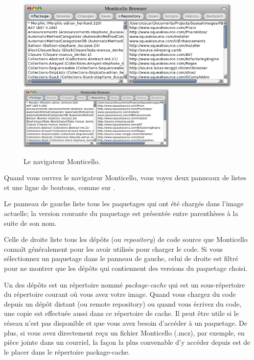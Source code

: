 \documentclass[a4paper,10pt,twoside]{book}
\begin{document}
\begin{figure}[btp]
	\begin{center}
	\ifluluelse
		{\includegraphics[width=\textwidth]{freshMonticello}}
		{\includegraphics[width=0.7\textwidth]{freshMonticello}}
	\end{center}
	\caption{Le navigateur Monticello.}
\end{figure}

Quand vous ouvrez le navigateur Monticello, vous voyez deux panneaux
de listes et une ligne de boutons, comme sur .

Le panneau de gauche liste tous les paquetages qui ont été chargés
dans l'image actuelle; la version courante du paquetage est
présentée entre parenthèses à la suite de son nom.

Celle de droite liste tous les dépôts (ou \emph{repository}) de code
source que Monticello connaît généralement pour les avoir utilisés
pour charger le code. Si vous sélectionnez un paquetage dans le panneau de 
gauche, celui de droite est filtré pour ne montrer que les dépôts
qui contiennent des versions du paquetage choisi.

Un des dépôts est un répertoire nommé \emph{package-cache} qui
est un sous-répertoire du répertoire courant où vous avez
votre image.
Quand vous chargez du code depuis un dépôt distant (ou remote repository)
ou quand vous écrivez du code, une copie est effectuée aussi dans ce
répertoire de cache. Il peut être utile si le réseau n'est pas 
disponible et que vous avez besoin d'accéder à un paquetage. De plus,
si vous avez directement reçu un fichier Monticello (.mcz), par exemple, 
en pièce jointe dans un courriel, la façon la plus convenable d'y accéder
depuis \pharo est de le placer dans le répertoire package-cache.
\end{document}
